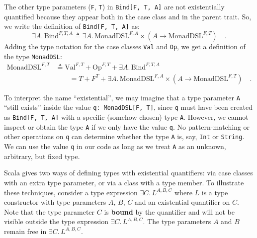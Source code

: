 The other type parameters (\lstinline!F!,
\lstinline!T!) in \lstinline!Bind[F, T, A]!
are not existentially quantified because they appear both in the case
class and in the parent trait. So, we write the definition of \lstinline!Bind[F, T, A]!
as: 
\[
\exists A.\,\text{Bind}^{F,T,A}\triangleq\exists A.\,\text{MonadDSL}^{F,A}\times(A\rightarrow\text{MonadDSL}^{F,T})\quad.
\]
Adding the type notation for the case classes \lstinline!Val!
and \lstinline!Op!, we
get a definition of the type \lstinline!MonadDSL!:
\begin{align*}
\text{MonadDSL}^{F,T} & \triangleq\text{Val}^{F,T}+\text{Op}^{F,T}+\exists A.\,\text{Bind}^{F,T,A}\\
 & \quad\quad=T+F^{T}+\exists A.\,\text{MonadDSL}^{F,A}\times(A\rightarrow\text{MonadDSL}^{F,T})\quad.
\end{align*}

To interpret the name \textsf{``}existential\textsf{''}, we may imagine that a type
parameter \lstinline!A!
\textsf{``}still exists\textsf{''} inside the value \lstinline!q: MonadDSL[F, T]!,
since \lstinline!q! must
have been created as \lstinline!Bind[F, T, A]!
with a specific (somehow chosen) type \lstinline!A!.
However, we cannot inspect or obtain the type \lstinline!A!
if we only have the value \lstinline!q!.
No pattern-matching or other operations on \lstinline!q!
can determine whether the type \lstinline!A!
is, say, \lstinline!Int!
or \lstinline!String!.
We can use the value \lstinline!q!
in our code as long as we treat \lstinline!A!
as an unknown, arbitrary, but fixed type.

Scala gives two ways of defining types with existential quantifiers:
via case classes with an extra type parameter, or via a class with
a type member. To illustrate these techniques, consider a type expression
$\exists C.\,L^{A,B,C}$ where $L$ is a type constructor with type
parameters $A$, $B$, $C$ and an existential quantifier on $C$.
Note that the type parameter $C$ is
\textbf{bound} by the quantifier and will not be visible outside the
type expression $\exists C.\,L^{A,B,C}$. The type parameters $A$
and $B$ remain free in $\exists C.\,L^{A,B,C}$.

